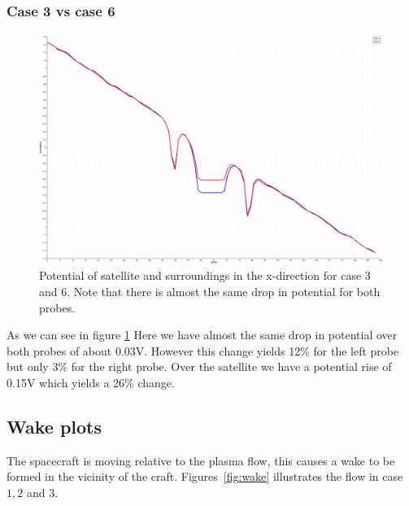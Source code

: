\subsubsection{Case 3 vs case 6}

\begin{figure}
    \centering
    \includegraphics[width = 0.6 \textwidth]{images/pot_case36_new.png}
    \caption{Potential of satellite and surroundings in the x-direction for case 3 and 6. Note that there is almost the same drop in potential for both probes.}
    \label{fig:pot_case36}
\end{figure}

As we can see in figure \ref{fig:pot_case36} Here we have almost the same drop in potential over both probes of about 0.03V. However this change yields 12\% for the left probe but only 3\% for the right probe. Over the satellite we have a potential rise of 0.15V which yields a 26\% change.

\subsection{Wake plots}
	The spacecraft is moving relative to the plasma flow, this causes a wake to be formed in the vicinity of the craft.
 	Figures~\ref{fig:wake} illustrates the flow in case \(1,2\) and \(3\).

